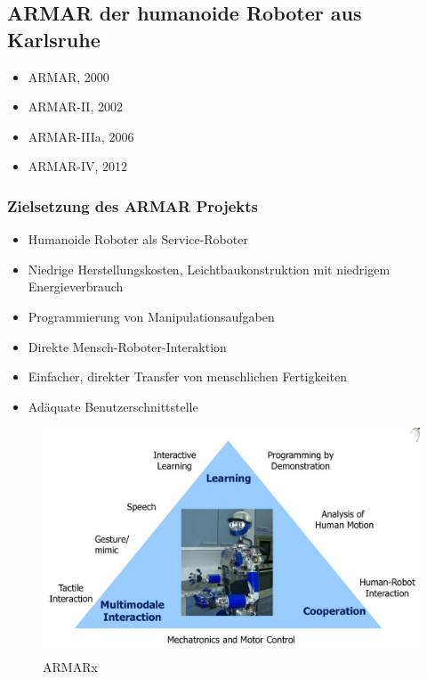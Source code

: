 \subsection{ARMAR der humanoide Roboter aus Karlsruhe}
\begin{itemize}
	\item ARMAR, 2000
	\item ARMAR-II, 2002
	\item ARMAR-IIIa, 2006
	\item ARMAR-IV, 2012
\end{itemize}

\subsubsection{Zielsetzung des ARMAR Projekts}
\begin{itemize}
	\item Humanoide Roboter als Service-Roboter
	\item Niedrige Herstellungskosten, Leichtbaukonstruktion mit niedrigem Energieverbrauch
	\item Programmierung von Manipulationsaufgaben
	\item Direkte Mensch-Roboter-Interaktion
	\item Einfacher, direkter Transfer von menschlichen Fertigkeiten
	\item Adäquate Benutzerschnittstelle
\end{itemize}

\begin{figure}
	\centering
	\includegraphics[width=.6\textwidth]{figures/armar.png}
	\caption{ARMARx}
\end{figure}


